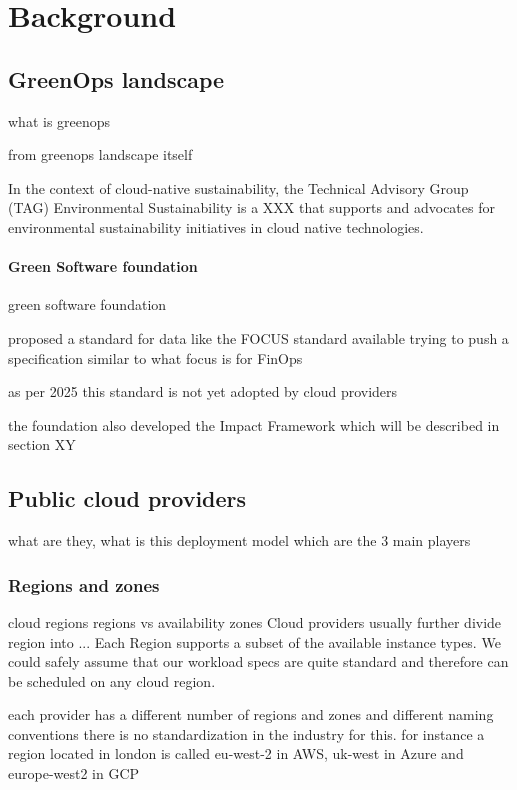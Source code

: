 \chapter{Background}
\label{cha:background}

\section{GreenOps landscape}

what is greenops

from greenops landscape itself

In the context of cloud-native sustainability,
the Technical Advisory Group (TAG) Environmental Sustainability is a XXX that supports and advocates for environmental sustainability initiatives in cloud native technologies.



\subsubsection{Green Software foundation}

green software foundation

proposed a standard for data like the FOCUS standard available 
trying to push a specification similar to what focus is for FinOps

as per 2025 this standard is not yet adopted by cloud providers

the foundation also developed the Impact Framework which will be described in section XY

\section{Public cloud providers}

what are they, what is this deployment model
which are the 3 main players

\subsection{Regions and zones}
cloud regions
regions vs availability zones
Cloud providers usually further divide region into ...
Each Region supports a subset of the available instance types.
We could safely assume that our workload specs are quite standard and therefore can be scheduled on any cloud region.

each provider has a different number of regions and zones and different naming conventions
there is no standardization in the industry for this. 
for instance a region located in london is called eu-west-2 in AWS, uk-west in Azure and europe-west2 in GCP

